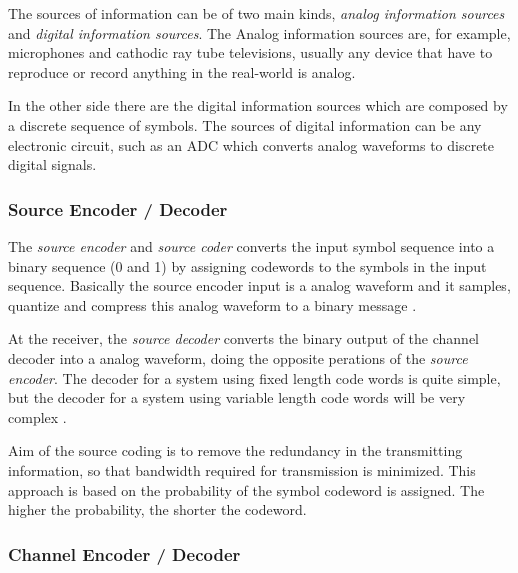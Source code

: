 The sources of information can be of two main kinds, \emph{analog information
sources} and \emph{digital information sources}. The Analog information sources
are, for example, microphones and cathodic ray tube televisions, usually any
device that have to reproduce or record anything in the real-world is analog.

In the other side there are the digital information sources which are composed
by a discrete sequence of symbols. The sources of digital information can be any
electronic circuit, such as an ADC which converts analog waveforms to discrete
digital signals.

\subsubsection{Source Encoder / Decoder}

The \emph{source encoder}  and \emph{source coder} converts the input symbol
sequence into a binary sequence (0 and 1) by assigning codewords to the symbols
in the input sequence. Basically the source encoder input is a analog waveform
and it samples, quantize and compress this analog waveform to a binary message
\cite{ocw:digicomm}.


At the receiver, the \emph{source decoder} converts the binary output of the
channel decoder into a analog waveform, doing the opposite perations of the
\emph{source encoder}. The decoder for a system using fixed length code words is
quite simple, but the decoder for a system using variable length code words will
be very complex \cite{ocw:digicomm}.

Aim of the source coding is to remove the redundancy in the transmitting
information, so that bandwidth required for transmission is minimized. This
approach is based on the probability of the symbol codeword is assigned. The
higher the probability, the shorter the codeword.

\subsubsection{Channel Encoder / Decoder}

